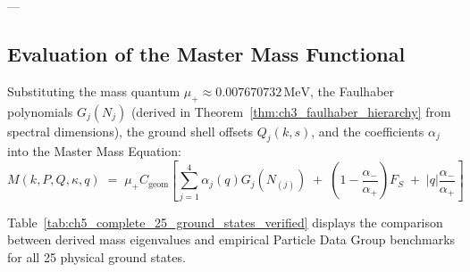 \documentclass[
    12pt,
    a4paper,
    headings=normal,
    twoside=false,
    open=any,
    parskip=half
]{scrbook}
\begin{document}
---

\subsection{Evaluation of the Master Mass Functional}

Substituting the mass quantum $\mu_+ \approx 0.007670732\,\text{MeV}$, the Faulhaber polynomials $G_j(N_j)$ (derived in Theorem~\ref{thm:ch3_faulhaber_hierarchy} from spectral dimensions), the ground shell offsets $Q_j(k, s)$, and the coefficients $\alpha_j$ into the Master Mass Equation:
\begin{equation}
\boxed{M(k, P, Q, \kappa, q) \;=\; \mu_+ C_{\text{geom}} \left[ \sum_{j=1}^4 \alpha_j(q) G_j\left( N_{(j)} \right) \;+\; \left( 1 - \frac{\alpha_-}{\alpha_+} \right) F_S \;+\; |q| \frac{\alpha_-}{\alpha_+} \right]}
\label{eq:ch5_master_mass_functional_complete}
\end{equation}

Table~\ref{tab:ch5_complete_25_ground_states_verified} displays the comparison between derived mass eigenvalues and empirical Particle Data Group benchmarks for all 25 physical ground states.
\end{document}
